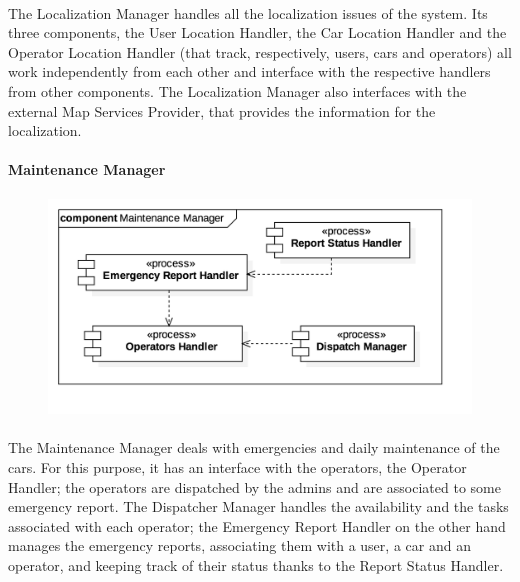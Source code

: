		\paragraph{} The Localization Manager handles all the localization issues of the system. Its three components, the User Location Handler, the Car Location Handler and the Operator Location Handler (that track, respectively, users, cars and operators) all work independently from each other and interface with the respective handlers from other components. The Localization Manager also interfaces with the external Map Services Provider, that provides the information for the localization.
		
		
		
		\paragraph{Maintenance Manager}
			\begin{figure}[h]
				\includegraphics[scale=0.4, center]{img/component_diagrams/06_maintenance_manager.png}
			\end{figure}
		
		\paragraph{} The Maintenance Manager deals with emergencies and daily maintenance of the cars. For this purpose, it has an interface with the operators, the Operator Handler; the operators are dispatched by the admins and are associated to some emergency report. The Dispatcher Manager handles the availability and the tasks associated with each operator; the Emergency Report Handler on the other hand manages the emergency reports, associating them with a user, a car and an operator, and keeping track of their status thanks to the Report Status Handler.
		

